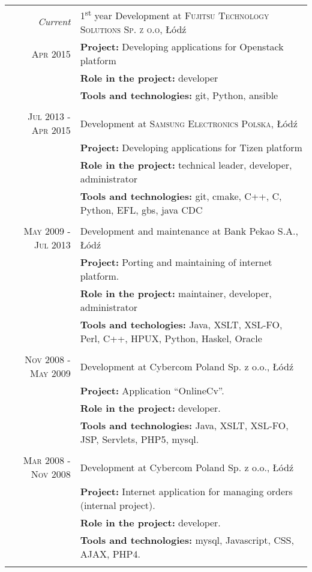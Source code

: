 \documentclass[a4paper,9pt]{article} %
\begin{document}
\begin{longtable}{r|p{11cm}}
\emph{Current} & 1\textsuperscript{st} year Development at \textsc{Fujitsu Technology Solutions Sp. z o.o}, Łódź \\
\textsc{Apr 2015} & \textbf{Project:} Developing applications for Openstack platform\\
& \textbf{Role in the project:} developer\\
& \textbf{Tools and technologies:} git, Python, ansible\\
\multicolumn{2}{c}{} \\

\textsc{Jul 2013 - Apr 2015} & Development at \textsc{Samsung Electronics Polska}, Łódź \\
& \textbf{Project:} Developing applications for Tizen platform\\
& \textbf{Role in the project:} technical leader, developer, administrator\\
& \textbf{Tools and technologies:} git, cmake, C++, C, Python, EFL, gbs, java CDC\\
\multicolumn{2}{c}{} \\

\textsc{May 2009 - Jul 2013} & Development and maintenance at Bank Pekao S.A., Łódź\\
& \textbf{Project:} Porting and maintaining of internet platform.\\
& \textbf{Role in the project:} maintainer, developer, administrator\\
& \textbf{Tools and techologies:} Java, XSLT, XSL-FO, Perl, C++, HPUX, Python, Haskel, Oracle\\
\multicolumn{2}{c}{} \\

\textsc{Nov 2008 - May 2009} & Development at Cybercom Poland Sp. z o.o., Łódź\\
& \textbf{Project:} Application “OnlineCv”.\\
& \textbf{Role in the project:} developer.\\
& \textbf{Tools and technologies:} Java, XSLT, XSL-FO, JSP, Servlets, PHP5, mysql.\\
\multicolumn{2}{c}{} \\

\textsc{Mar 2008 - Nov 2008} & Development at Cybercom Poland Sp. z o.o., Łódź\\
& \textbf{Project:} Internet application for managing orders (internal project).\\
& \textbf{Role in the project:} developer.\\
& \textbf{Tools and technologies:} mysql, Javascript, CSS, AJAX, PHP4.\\
\multicolumn{2}{c}{} \\


\end{longtable}
\end{document}
